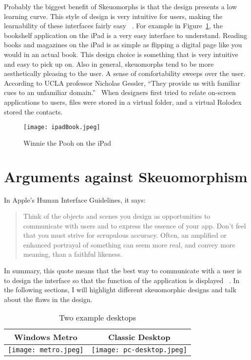 \documentclass{article}
\begin{document}
Probably the biggest benefit of Skeuomorphs is that the design presents a low learning curve. This style of design is very intuitive for users, making the learnability of these interfaces fairly easy ~\cite{Former-UI}. For example in Figure~\ref{book}, the bookshelf application on the iPad is a very easy interface to understand. Reading books and magazines on the iPad is as simple as flipping a digital page like you would in an actual book. This design choice is something that is very intuitive and easy to pick up on. Also in general, skeuomorphs tend to be more aesthetically pleasing to the user. A sense of comfortability sweeps over the user. According to UCLA professor Nicholas Gessler, “They provide us with familiar cues to an unfamiliar domain.”~\cite{Gessler} When designers first tried to relate on-screen applications to users, files were stored in a virtual folder, and a virtual Rolodex stored the contacts. ~\cite{FastCompany3}
\begin{figure}
\centering
\texttt{[image: ipadBook.jpeg]} 

\caption{Winnie the Pooh on the iPad}
\label{book}
\end{figure}
\section{Arguments against Skeuomorphism}

In Apple’s Human Interface Guidelines, it says:

\begin{quote}Think of the objects and scenes you design as opportunities to communicate with users and to express the essence of your app. Don't feel that you must strive for scrupulous accuracy. Often, an amplified or enhanced portrayal of something can seem more real, and convey more meaning, than a faithful likeness.\end{quote}

In summary, this quote means that the best way to communicate with a user is to design the interface so that the function of the application is displayed ~\cite{Gizmodo}. In the following sections, I will highlight different skeuomorphic designs and talk about the flaws in the design.

\begin{table}
\centering
\begin{tabular}{|c|c|}\hline
Windows Metro & Classic Desktop \\\hline\hline
\texttt{[image: metro.jpeg]} & \texttt{[image: pc-desktop.jpeg]} \\\hline
\end{tabular}

\caption{Two example desktops}
\label{desktops}
\end{table}
\end{document}
